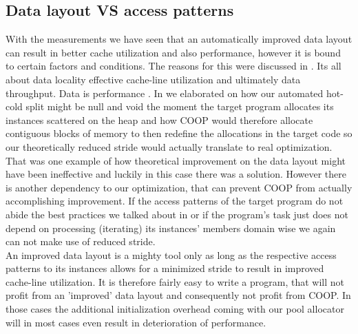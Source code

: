 \subsection{Data layout VS access patterns}
With the measurements we have seen that an automatically improved data layout can result in better cache utilization and also performance, however it is bound to certain factors and conditions. The reasons for this were discussed in . Its all about data locality effective cache-line utilization and ultimately data throughput. Data is performance . In  we elaborated on how our automated hot-cold split might be null and void the moment the target program allocates its instances scattered on the heap and how COOP would therefore allocate contiguous blocks of memory to then redefine the allocations in the target code so our theoretically reduced stride would actually translate to real optimization.\\
That was one example of how theoretical improvement on the data layout might have been ineffective and luckily in this case there was a solution. However there is another dependency to our optimization, that can prevent COOP from actually accomplishing improvement. If the access patterns of the target program do not abide the best practices we talked about in  or if the program's task just does not depend on processing (iterating) its instances' members domain wise we again can not make use of reduced stride.\\
An improved data layout is a mighty tool only as long as the respective access patterns to its instances allows for a minimized stride to result in improved cache-line utilization. It is therefore fairly easy to write a program, that will not profit from an 'improved' data layout and consequently not profit from COOP. In those cases the additional initialization overhead coming with our pool allocator will in most cases even result in deterioration of performance.

